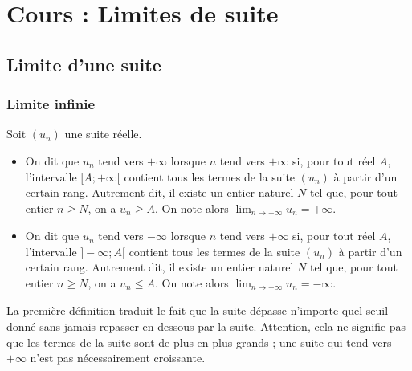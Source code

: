\documentclass[11pt,fleqn]{book} %
\begin{document}


\chapter{Cours : Limites de suite}


\section{Limite d'une suite}

\subsection{Limite infinie}

\begin{definition}Soit $(u_n)$ une suite réelle. 
\begin{itemize}
\item On dit que $u_n$ tend vers $+\infty$ lorsque $n$ tend vers $+\infty$ si, pour tout réel $A$, l'intervalle $[A ; +\infty [$ contient tous les termes de la suite $(u_n)$ à partir d'un certain rang. Autrement dit, il existe un entier naturel $N$ tel que, pour tout entier $n \geqslant N$, on a $u_n \geqslant A$. On note alors $\displaystyle \lim _{n\to +\infty} u_n = +\infty$.
\item On dit que $u_n$ tend vers $-\infty$ lorsque $n$ tend vers $+\infty$ si, pour tout réel $A$, l'intervalle $] -\infty ; A [$ contient tous les termes de la suite $(u_n)$ à partir d'un certain rang. Autrement dit, il existe un entier naturel $N$ tel que, pour tout entier $n \geqslant N$, on a $u_n \leqslant A$. On note alors $\displaystyle \lim _{n\to +\infty} u_n = -\infty$.\end{itemize}\end{definition}

La première définition traduit le fait que la suite dépasse n'importe quel seuil donné sans jamais repasser en dessous par la suite. Attention, cela ne signifie pas que les termes de la suite sont de plus en plus grands ; une suite qui tend vers $+\infty$ n'est pas nécessairement croissante.
\end{document}
